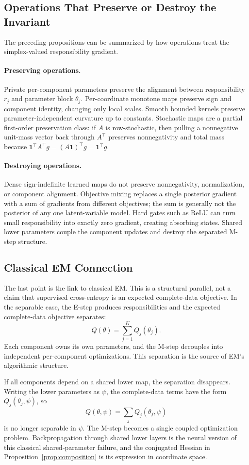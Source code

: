 \subsection{Operations That Preserve or Destroy the Invariant}
The preceding propositions can be summarized by how operations treat the
simplex-valued responsibility gradient.
\paragraph{Preserving operations.}
Private per-component parameters preserve the alignment between responsibility
$r_j$ and parameter block $\theta_j$. Per-coordinate monotone maps preserve
sign and component identity, changing only local scales. Smooth bounded
kernels preserve parameter-independent curvature up to constants. Stochastic
maps are a partial first-order preservation class: if $A$ is row-stochastic,
then pulling a nonnegative unit-mass vector back through $A^\top$ preserves
nonnegativity and total mass because
$\mathbf{1}^\top A^\top g=(A\mathbf{1})^\top g=\mathbf{1}^\top g$.
\paragraph{Destroying operations.}
Dense sign-indefinite learned maps do not preserve nonnegativity,
normalization, or component alignment. Objective mixing replaces a single
posterior gradient with a sum of gradients from different objectives; the sum
is generally not the posterior of any one latent-variable model. Hard gates
such as ReLU can turn small responsibility into exactly zero gradient,
creating absorbing states. Shared lower parameters couple the component
updates and destroy the separated M-step structure.

\subsection{Classical EM Connection}
The last point is the link to classical EM. This is a structural parallel, not
a claim that supervised cross-entropy is an expected complete-data objective.
In the separable case, the E-step produces responsibilities and the expected
complete-data objective separates:
\[
    Q(\theta)=\sum_{j=1}^K Q_j(\theta_j).
\]
Each component owns its own parameters, and the M-step decouples into
independent per-component optimizations. This separation is the source of
EM's algorithmic structure.

If all components depend on a shared lower map, the separation disappears.
Writing the lower parameters as $\psi$, the complete-data terms have the form
$Q_j(\theta_j,\psi)$, so
\[
    Q(\theta,\psi)=\sum_j Q_j(\theta_j,\psi)
\]
is no longer separable in $\psi$. The M-step becomes a single coupled
optimization problem. Backpropagation through shared lower layers is the
neural version of this classical shared-parameter failure, and the conjugated
Hessian in Proposition~\ref{prop:composition} is its expression in coordinate
space.

